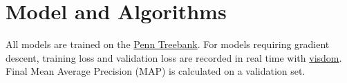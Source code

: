 \documentclass[11pt]{article}
\begin{document}
%
%
%
%
%
%

\section{Model and Algorithms}

All models are trained on the \href{http://aclweb.org/anthology/J93-2004}{Penn Treebank}. For models requiring gradient descent, training loss and validation loss are recorded in real time with \href{https://github.com/facebookresearch/visdom}{visdom}. Final Mean Average Precision (MAP) is calculated on a validation set. 
\end{document}
